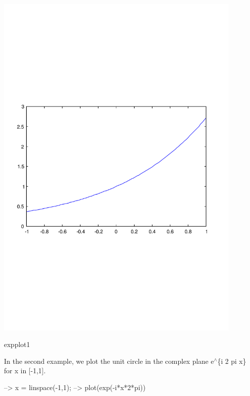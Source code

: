  
\begin{DoxyImage}
\includegraphics[width=12cm]{expplot1}
\caption{expplot1}
\end{DoxyImage}
 In the second example, we plot the unit circle in the complex plane {\ttfamily e$^\wedge$\{i 2 pi x\}} for {\ttfamily x in \mbox{[}-\/1,1\mbox{]}}.


\begin{DoxyVerbInclude}
--> x = linspace(-1,1);
--> plot(exp(-i*x*2*pi))
\end{DoxyVerbInclude}


